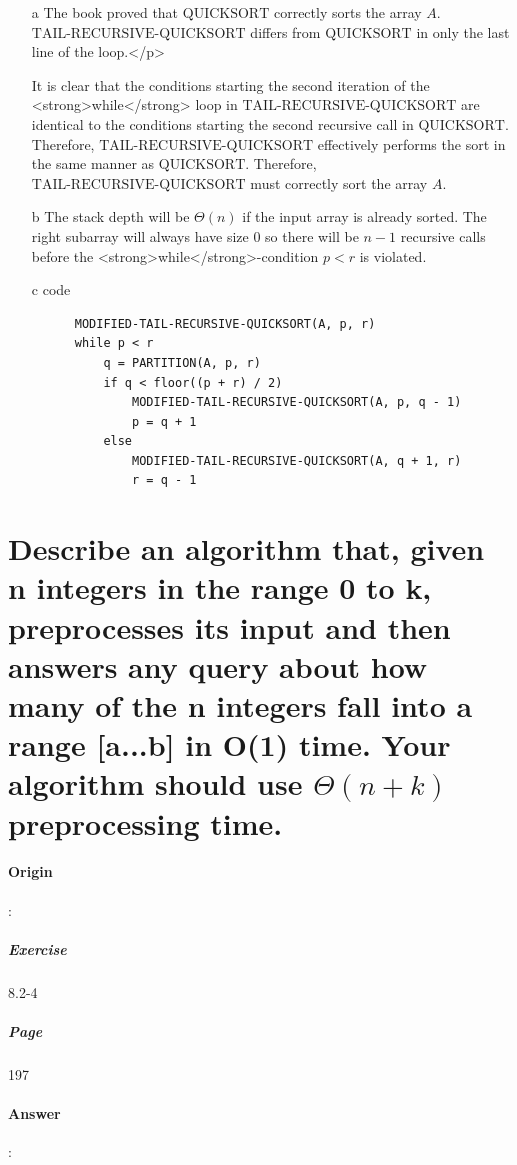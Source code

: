 \documentclass{article}
\begin{document}
  \begin{enumerate}
    \item[a] The book proved that $\text{QUICKSORT}$ correctly sorts the array $A$. $\text{TAIL-RECURSIVE-QUICKSORT}$ differs from $\text{QUICKSORT}$ in only the last line of the loop.</p>
    
    It is clear that the conditions starting the second iteration of the <strong>while</strong> loop in $\text{TAIL-RECURSIVE-QUICKSORT}$ are identical to the conditions starting the second recursive call in $\text{QUICKSORT}$. Therefore, $\text{TAIL-RECURSIVE-QUICKSORT}$ effectively performs the sort in the same manner as $\text{QUICKSORT}$. Therefore, $\text{TAIL-RECURSIVE-QUICKSORT}$ must correctly sort the array $A$.

    \item[b] The stack depth will be $\Theta(n)$ if the input array is already sorted. The right subarray will always have size $0$ so there will be $n - 1$ recursive calls before the <strong>while</strong>-condition $p < r$ is violated.
    \item[c] code
    \begin{lstlisting}
      MODIFIED-TAIL-RECURSIVE-QUICKSORT(A, p, r)
      while p < r
          q = PARTITION(A, p, r)
          if q < floor((p + r) / 2)
              MODIFIED-TAIL-RECURSIVE-QUICKSORT(A, p, q - 1)
              p = q + 1
          else
              MODIFIED-TAIL-RECURSIVE-QUICKSORT(A, q + 1, r)
              r = q - 1
    \end{lstlisting}

  \end{enumerate}

  \section{Describe an algorithm that, given n integers in the range 0 to k, preprocesses its input and then answers any query about how many of the n integers fall into a range [a...b] in O(1) time. Your algorithm should use $\Theta(n+k)$ preprocessing time.}
  \paragraph{Origin}:
    \subparagraph{Exercise}8.2-4
    \subparagraph{Page}197
  \paragraph{Answer}:
\end{document}
